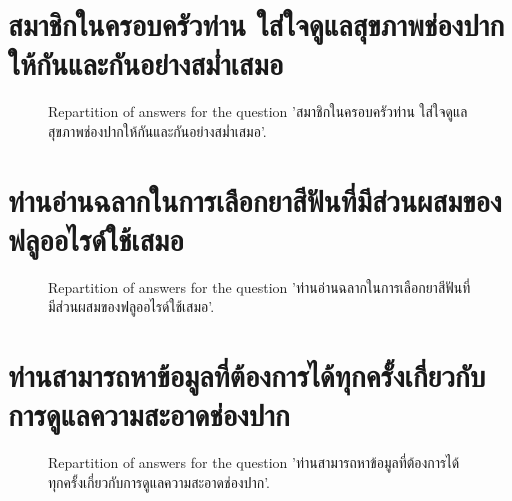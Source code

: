 \documentclass[12pt]{article}
\begin{document}
\clearpage{}
\section{สมาชิกในครอบครัวท่าน ใส่ใจดูแลสุขภาพช่องปากให้กันและกันอย่างสม่ำเสมอ}

\label{sec:114}


\begin{figure}[h!]
    \caption{\label{figure:q114-1}Repartition of answers for the question 'สมาชิกในครอบครัวท่าน ใส่ใจดูแลสุขภาพช่องปากให้กันและกันอย่างสม่ำเสมอ'.}
\end{figure}



\clearpage{}
\section{ท่านอ่านฉลากในการเลือกยาสีฟันที่มีส่วนผสมของฟลูออไรด์ใช้เสมอ}

\label{sec:115}


\begin{figure}[h!]
    \caption{\label{figure:q115-1}Repartition of answers for the question 'ท่านอ่านฉลากในการเลือกยาสีฟันที่มีส่วนผสมของฟลูออไรด์ใช้เสมอ'.}
\end{figure}



\clearpage{}
\section{ท่านสามารถหาข้อมูลที่ต้องการได้ทุกครั้งเกี่ยวกับการดูแลความสะอาดช่องปาก}

\label{sec:116}


\begin{figure}[h!]
    \caption{\label{figure:q116-1}Repartition of answers for the question 'ท่านสามารถหาข้อมูลที่ต้องการได้ทุกครั้งเกี่ยวกับการดูแลความสะอาดช่องปาก'.}
\end{figure}
\end{document}
